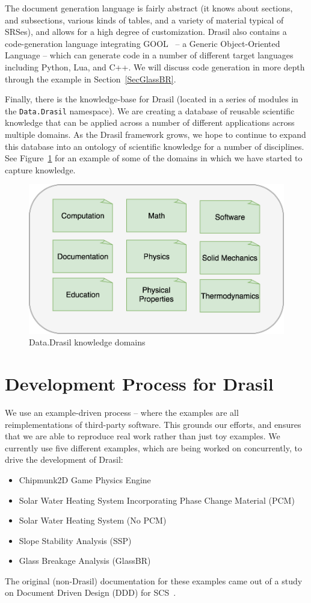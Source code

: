 \documentclass[sigconf]{acmart}
\begin{document}
The document generation language is fairly abstract (it knows about sections,
and subsections, various kinds of tables, and a variety of material typical
of SRSes), and allows for a
high degree of customization. Drasil also contains a code-generation language
integrating GOOL~\cite{Costabile2012} -- a Generic Object-Oriented Language -- which can
generate code in a number of different target languages including Python, Lua,
and C++.  We will discuss code generation in more depth through the example in
Section~\ref{SecGlassBR}.

Finally, there is the knowledge-base for Drasil (located in a series of
modules in the \lstinline|Data.Drasil| namespace). We 
are creating a database of reusable scientific knowledge that can be applied 
across a number of different applications across multiple domains. As the 
Drasil framework grows, we hope to continue to expand this database into an 
ontology of scientific knowledge for a number of disciplines. See 
Figure~\ref{ontology} for an example of some of the domains in which we have 
started to capture knowledge.

\begin{figure}
    \includegraphics[width=.5\textwidth]{figures/ontology.png}
    \caption{Data.Drasil knowledge domains}
    \label{ontology}
\end{figure}

\section{Development Process for Drasil} \label{SecDevProcess}

We use an example-driven process -- where the examples are all reimplementations
of third-party software.  This grounds our efforts, and ensures that we are
able to reproduce real work rather than just toy examples.
We currently use five different examples, which are being worked on concurrently,
to drive the development of Drasil:

\begin{itemize}
\item Chipmunk2D Game Physics Engine
\item Solar Water Heating System Incorporating Phase Change Material (PCM)
\item Solar Water Heating System (No PCM)
\item Slope Stability Analysis (SSP)
\item Glass Breakage Analysis (GlassBR)
\end{itemize}
The original (non-Drasil) documentation for these examples came out of a study
on Document Driven Design (DDD) for SCS~\cite{SmithJegatheesanAndKelly2016}.
\end{document}
